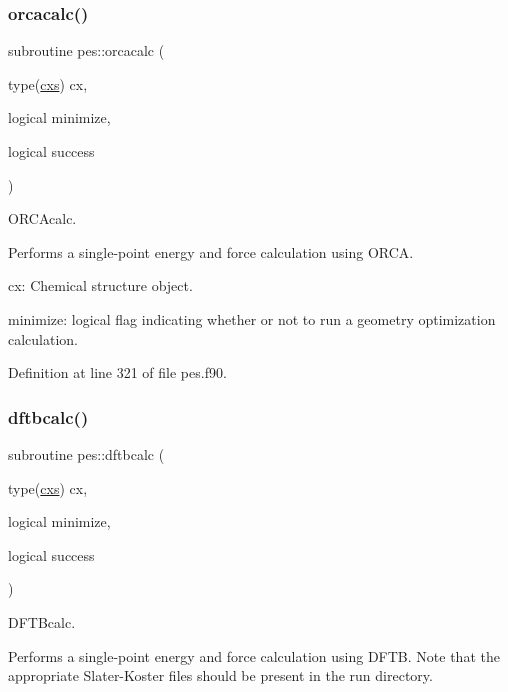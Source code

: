 \mbox{\label{namespacepes_a6b568c2913c8ad55cce5d368183af9c0}} 
\subsubsection{\texorpdfstring{orcacalc()}{orcacalc()}}
{\footnotesize\ttfamily subroutine pes\+::orcacalc (\begin{DoxyParamCaption}\item[{type(\mbox{\hyperlink{structchemstr_1_1cxs}{cxs}})}]{cx,  }\item[{logical}]{minimize,  }\item[{logical}]{success }\end{DoxyParamCaption})}



O\+R\+C\+Acalc. 

Performs a single-\/point energy and force calculation using O\+R\+CA.


\begin{DoxyItemize}
\item cx\+: Chemical structure object.
\item minimize\+: logical flag indicating whether or not to run a geometry optimization calculation. 
\end{DoxyItemize}

Definition at line 321 of file pes.\+f90.

\mbox{\label{namespacepes_a6b9874a523e27244b65c34e696f2a67d}} 
\subsubsection{\texorpdfstring{dftbcalc()}{dftbcalc()}}
{\footnotesize\ttfamily subroutine pes\+::dftbcalc (\begin{DoxyParamCaption}\item[{type(\mbox{\hyperlink{structchemstr_1_1cxs}{cxs}})}]{cx,  }\item[{logical}]{minimize,  }\item[{logical}]{success }\end{DoxyParamCaption})}



D\+F\+T\+Bcalc. 

Performs a single-\/point energy and force calculation using D\+F\+TB. Note that the appropriate Slater-\/\+Koster files should be present in the run directory.


